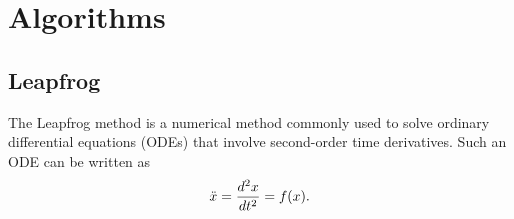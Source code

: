 \documentclass{article}
\begin{document}
\newcommand{\vecthreeBF}[1]{\vec{\textbf{#1}}}
\newcommand{\vecthree}[1]{\vec{#1}}

\newcommand{\parDeriv}[2]{\frac{\partial #1}{\partial #2}}
\newcommand{\parDerivS}[2]{\frac{\partial^2 #1}{\partial #2^2}}
\newcommand{\deriv}[2]{\frac{d #1}{d #2}}
\newcommand{\derivS}[2]{\frac{d^2 #1}{d#2^2}}

\newcommand{\dotProdBF}[2]{\vecthreeBF{#1} \cdot \vecthreeBF{#2}}
\newcommand{\dotProd}[2]{\vecthree{#1} \cdot \vecthree{#2}}

\newcommand{\crossProdBF}[2]{\vecthreeBF{#1} \times \vecthreeBF{#2}}
\newcommand{\crossProd}[2]{\vecthree{#1} \times \vecthree{#2}}


\newcommand{\fromeq}[1]{\textit{equation \ref{eq:#1}}}
\newcommand{\fromeqs}[2]{\textit{equations \ref{eq:#1} and \ref{eq:#2}}}

\newcommand{\fromfig}[1]{\textit{figure \ref{fig:#1}}}


\clearpage
\section{Algorithms}

\subsection{Leapfrog} \label{sec:leapfrog}
The Leapfrog method is a numerical method commonly used to solve ordinary differential equations (ODEs) that involve second-order time derivatives. Such an ODE can be written as
\vspace{-10pt}\begin{equation}
    \ddot{x} = \derivS{x}{t} = f(x) .\label{eq:second-order-ODE}
\vspace{-10pt}\end{equation}
\end{document}
